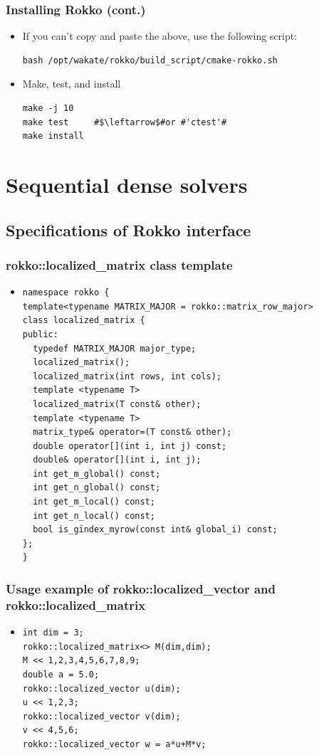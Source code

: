 \begin{frame}[c,fragile]
  \frametitle{Installing Rokko (cont.)}
  \begin{itemize}
  \item If you can't copy and paste the above, use the following script:
\begin{lstlisting}[style=shstyle]
bash /opt/wakate/rokko/build_script/cmake-rokko.sh
\end{lstlisting}
  \item Make, test, and install
\begin{lstlisting}[style=shstyle]
make -j 10
make test     #$\leftarrow$#or #'ctest'#
make install
\end{lstlisting}
  \end{itemize}
\end{frame}


\section{Sequential dense solvers}

\subsection{Specifications of Rokko interface}

\begin{frame}[c,fragile]
  \frametitle{rokko::localized\_matrix class template}
  \begin{itemize}
  \item {}
\begin{lstlisting}
namespace rokko {
template<typename MATRIX_MAJOR = rokko::matrix_row_major>
class localized_matrix {
public:
  typedef MATRIX_MAJOR major_type;
  localized_matrix();
  localized_matrix(int rows, int cols);
  template <typename T>
  localized_matrix(T const& other);
  template <typename T>
  matrix_type& operator=(T const& other);
  double operator[](int i, int j) const;
  double& operator[](int i, int j);
  int get_m_global() const;
  int get_n_global() const;
  int get_m_local() const;
  int get_n_local() const;
  bool is_gindex_myrow(const int& global_i) const;
};
}
\end{lstlisting}
  \end{itemize}
\end{frame}

\begin{frame}[c,fragile]
  \frametitle{Usage example of rokko::localized\_vector and rokko::localized\_matrix}
  \begin{itemize}
  \item {}
\begin{lstlisting}
int dim = 3;
rokko::localized_matrix<> M(dim,dim);
M << 1,2,3,4,5,6,7,8,9;
double a = 5.0;
rokko::localized_vector u(dim);
u << 1,2,3;
rokko::localized_vector v(dim);
v << 4,5,6;
rokko::localized_vector w = a*u+M*v;
\end{lstlisting}
  \end{itemize}
\end{frame}

